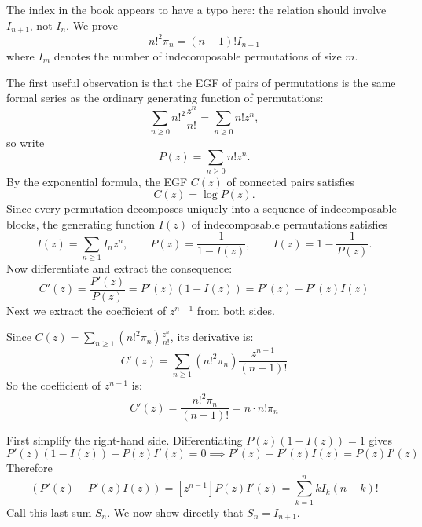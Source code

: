 The index in the book appears to have a typo here: the relation should involve $I_{n+1}$,
not $I_n$. We prove
\begin{equation*}
    n!^{2}\pi_{n} = (n - 1)!I_{n + 1}
\end{equation*}
where $I_m$ denotes the number of indecomposable permutations of size $m$.

The first useful observation is that the EGF of pairs of permutations is the same formal series
as the ordinary generating function of permutations:
\begin{equation*}
    \sum_{n \geq 0} n!^{2} \frac{z^{n}}{n!} = \sum_{n \geq 0} n!z^{n},
\end{equation*}
so write
\begin{equation*}
    P(z) = \sum_{n \geq 0} n!z^n.
\end{equation*}
By the exponential formula, the EGF $C(z)$ of connected pairs satisfies
\begin{equation*}
    C(z) = \log P(z).
\end{equation*}
Since every permutation decomposes uniquely into a sequence of indecomposable blocks, the generating function $I(z)$ of indecomposable permutations satisfies
\begin{equation*}
    I(z) = \sum_{n \geq 1} I_n z^n, \qquad
    P(z) = \frac{1}{1 - I(z)}, \qquad
    I(z) = 1 - \frac{1}{P(z)}.
\end{equation*}
Now differentiate and extract the consequence:
\begin{equation*}
    C'(z) = \frac{P'(z)}{P(z)} = P'(z)(1 - I(z)) = P'(z) - P'(z)I(z)
\end{equation*}
Next we extract the coefficient of $z^{n - 1}$ from both sides.

Since $C(z) = \sum_{n \geq 1}(n!^{2}\pi_{n})\frac{z^{n}}{n!}$, its derivative is:
\begin{equation*}
    C'(z) = \sum_{n \geq 1}(n!^{2}\pi_{n})\frac{z^{n - 1}}{(n - 1)!}
\end{equation*}
So the coefficient of $z^{n - 1}$ is:
\begin{equation*}
    [z^{n - 1}] C'(z) = \frac{n!^{2}\pi_{n}}{(n - 1)!} = n \cdot n!\pi_{n}
\end{equation*}

First simplify the right-hand side. Differentiating $P(z)(1 - I(z)) = 1$ gives
\begin{equation*}
    P'(z)(1 - I(z)) - P(z)I'(z) = 0 \implies P'(z) - P'(z)I(z) = P(z)I'(z)
\end{equation*}
Therefore
\begin{equation*}
    [z^{n - 1}] (P'(z) - P'(z)I(z)) = [z^{n - 1}] P(z)I'(z) = \sum_{k = 1}^{n} kI_{k}(n - k)!
\end{equation*}
Call this last sum $S_n$. We now show directly that $S_n=I_{n+1}$.

